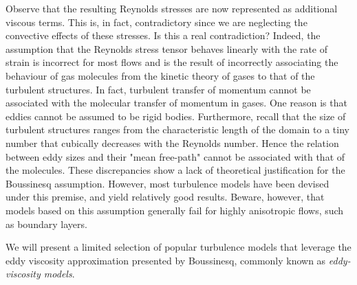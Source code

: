 Observe that the resulting Reynolds stresses are now represented as additional viscous terms. This is, in fact, contradictory since we are neglecting the convective effects of these stresses. Is this a real contradiction?  Indeed, the assumption that the Reynolds stress tensor behaves linearly with the rate of strain is incorrect for most flows and is the result of incorrectly associating the behaviour of gas molecules from the kinetic theory of gases to that of the turbulent structures. In fact, turbulent transfer of momentum cannot be associated with the molecular transfer of momentum in gases. One reason is that eddies cannot be assumed to be rigid bodies. Furthermore, recall that the size of turbulent structures ranges from the characteristic length of the domain to a tiny number that cubically decreases with the Reynolds number. Hence the relation between eddy sizes and their "mean free-path" cannot be associated with that of the molecules. These discrepancies show a lack of theoretical justification for the Boussinesq assumption. However, most turbulence models have been devised under this premise, and yield relatively good results. Beware, however, that models based on this assumption generally fail for highly anisotropic flows, such as boundary layers.

We will present a limited selection of popular turbulence models that leverage the eddy viscosity approximation presented by Boussinesq, commonly known as \textit{eddy-viscosity models}.

